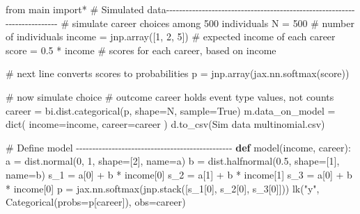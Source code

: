 \documentclass[
  letterpaper,
  DIV=11,
  numbers=noendperiod]{scrreprt}
\newenvironment{Shaded}{\begin{snugshade}}{\end{snugshade}}
\newcommand{\BuiltInTok}[1]{\textcolor[rgb]{0.00,0.23,0.31}{#1}}
\newcommand{\CommentTok}[1]{\textcolor[rgb]{0.37,0.37,0.37}{#1}}
\newcommand{\DecValTok}[1]{\textcolor[rgb]{0.68,0.00,0.00}{#1}}
\newcommand{\FloatTok}[1]{\textcolor[rgb]{0.68,0.00,0.00}{#1}}
\newcommand{\ImportTok}[1]{\textcolor[rgb]{0.00,0.46,0.62}{#1}}
\newcommand{\KeywordTok}[1]{\textcolor[rgb]{0.00,0.23,0.31}{\textbf{#1}}}
\newcommand{\NormalTok}[1]{\textcolor[rgb]{0.00,0.23,0.31}{#1}}
\newcommand{\OperatorTok}[1]{\textcolor[rgb]{0.37,0.37,0.37}{#1}}
\newcommand{\StringTok}[1]{\textcolor[rgb]{0.13,0.47,0.30}{#1}}
\newcommand{\VariableTok}[1]{\textcolor[rgb]{0.07,0.07,0.07}{#1}}
\begin{document}
\begin{Shaded}
\begin{Highlighting}[]
\ImportTok{from}\NormalTok{ main }\ImportTok{import}\OperatorTok{*}
\CommentTok{\# Simulated data{-}{-}{-}{-}{-}{-}{-}{-}{-}{-}{-}{-}{-}{-}{-}{-}{-}{-}{-}{-}{-}{-}{-}{-}{-}{-}{-}{-}{-}{-}{-}{-}{-}{-}{-}{-}{-}{-}{-}{-}{-}{-}{-}{-}{-}{-}{-}{-}{-}{-}{-}{-}{-}{-}{-}{-}{-}{-}{-}{-}{-}{-}{-}{-}{-}{-}{-}{-}{-}{-}{-}{-}{-}{-}}
\CommentTok{\# simulate career choices among 500 individuals}
\NormalTok{N }\OperatorTok{=} \DecValTok{500}  \CommentTok{\# number of individuals}
\NormalTok{income }\OperatorTok{=}\NormalTok{ jnp.array([}\DecValTok{1}\NormalTok{, }\DecValTok{2}\NormalTok{, }\DecValTok{5}\NormalTok{])  }\CommentTok{\# expected income of each career}
\NormalTok{score }\OperatorTok{=} \FloatTok{0.5} \OperatorTok{*}\NormalTok{ income  }\CommentTok{\# scores for each career, based on income}

\CommentTok{\# next line converts scores to probabilities}
\NormalTok{p }\OperatorTok{=}\NormalTok{ jnp.array(jax.nn.softmax(score))}

\CommentTok{\# now simulate choice}
\CommentTok{\# outcome career holds event type values, not counts}
\NormalTok{career }\OperatorTok{=}\NormalTok{ bi.dist.categorical(p, shape}\OperatorTok{=}\NormalTok{N, sample}\OperatorTok{=}\VariableTok{True}\NormalTok{)}
\NormalTok{m.data\_on\_model }\OperatorTok{=} \BuiltInTok{dict}\NormalTok{(}
\NormalTok{    income}\OperatorTok{=}\NormalTok{income,}
\NormalTok{    career}\OperatorTok{=}\NormalTok{career}
\NormalTok{)}
\NormalTok{d.to\_csv(}\StringTok{\textquotesingle{}Sim data multinomial.csv\textquotesingle{}}\NormalTok{)}

\CommentTok{\# Define model {-}{-}{-}{-}{-}{-}{-}{-}{-}{-}{-}{-}{-}{-}{-}{-}{-}{-}{-}{-}{-}{-}{-}{-}{-}{-}{-}{-}{-}{-}{-}{-}{-}{-}{-}{-}{-}{-}{-}{-}{-}{-}{-}{-}{-}{-}{-}{-}}
\KeywordTok{def}\NormalTok{ model(income, career):}
\NormalTok{    a }\OperatorTok{=}\NormalTok{ dist.normal(}\DecValTok{0}\NormalTok{, }\DecValTok{1}\NormalTok{, shape}\OperatorTok{=}\NormalTok{[}\DecValTok{2}\NormalTok{], name}\OperatorTok{=}\StringTok{\textquotesingle{}a\textquotesingle{}}\NormalTok{)}
\NormalTok{    b }\OperatorTok{=}\NormalTok{ dist.halfnormal(}\FloatTok{0.5}\NormalTok{, shape}\OperatorTok{=}\NormalTok{[}\DecValTok{1}\NormalTok{], name}\OperatorTok{=}\StringTok{\textquotesingle{}b\textquotesingle{}}\NormalTok{)}
\NormalTok{    s\_1 }\OperatorTok{=}\NormalTok{ a[}\DecValTok{0}\NormalTok{] }\OperatorTok{+}\NormalTok{ b }\OperatorTok{*}\NormalTok{ income[}\DecValTok{0}\NormalTok{]}
\NormalTok{    s\_2 }\OperatorTok{=}\NormalTok{ a[}\DecValTok{1}\NormalTok{] }\OperatorTok{+}\NormalTok{ b }\OperatorTok{*}\NormalTok{ income[}\DecValTok{1}\NormalTok{]}
\NormalTok{    s\_3 }\OperatorTok{=}\NormalTok{ a[}\DecValTok{0}\NormalTok{] }\OperatorTok{+}\NormalTok{ b }\OperatorTok{*}\NormalTok{ income[}\DecValTok{0}\NormalTok{]}
\NormalTok{    p }\OperatorTok{=}\NormalTok{ jax.nn.softmax(jnp.stack([s\_1[}\DecValTok{0}\NormalTok{], s\_2[}\DecValTok{0}\NormalTok{], s\_3[}\DecValTok{0}\NormalTok{]]))}
\NormalTok{    lk(}\StringTok{"y"}\NormalTok{, Categorical(probs}\OperatorTok{=}\NormalTok{p[career]), obs}\OperatorTok{=}\NormalTok{career)}


\end{Highlighting}
\end{Shaded}
\end{document}
